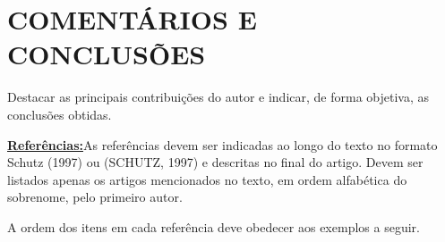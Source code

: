 \documentclass[]{seti2}
\begin{document}
\section{COMENTÁRIOS E CONCLUSÕES}
Destacar as principais contribuições do autor e indicar, de forma objetiva, as conclusões obtidas.

\vspace{\baselineskip} %
\vspace{\baselineskip} %

\underline{\textbf{Referências:}}As referências devem ser indicadas ao longo do texto no formato Schutz (1997) ou (SCHUTZ, 1997) e descritas no final do artigo. Devem ser listados apenas os artigos mencionados no texto, em ordem alfabética do sobrenome, pelo primeiro autor. 

A ordem dos itens em cada referência deve obedecer aos exemplos a seguir.
\end{document}
